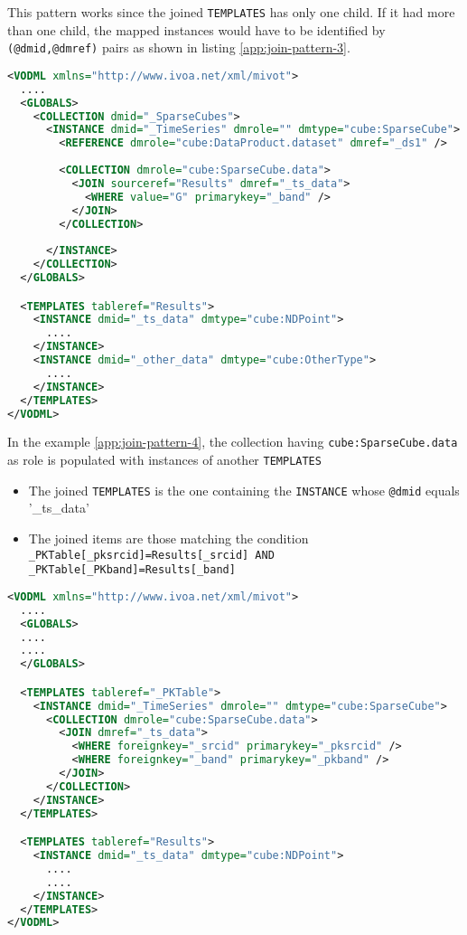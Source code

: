 This pattern works since the joined \texttt{TEMPLATES} has only one child. 
If it had more than one child, the mapped instances would have to be identified by \texttt{(@dmid,@dmref)} pairs as shown in listing \ref{app:join-pattern-3}.

\begin{lstlisting}[label={app:join-pattern-3},caption={Joining a \texttt{TEMPLATES} with a global \texttt{COLLECTION} identified by both \texttt{@sourceref} and \texttt{(@dmid,@dmref)} pairs.},language=XML]
<VODML xmlns="http://www.ivoa.net/xml/mivot">
  ....
  <GLOBALS>
    <COLLECTION dmid="_SparseCubes">
      <INSTANCE dmid="_TimeSeries" dmrole="" dmtype="cube:SparseCube">
        <REFERENCE dmrole="cube:DataProduct.dataset" dmref="_ds1" />
        
        <COLLECTION dmrole="cube:SparseCube.data">
          <JOIN sourceref="Results" dmref="_ts_data">
            <WHERE value="G" primarykey="_band" />
          </JOIN>
        </COLLECTION>
        
      </INSTANCE>
    </COLLECTION>
  </GLOBALS>

  <TEMPLATES tableref="Results">
    <INSTANCE dmid="_ts_data" dmtype="cube:NDPoint">
      ....
    </INSTANCE>
    <INSTANCE dmid="_other_data" dmtype="cube:OtherType">
      ....
    </INSTANCE>
  </TEMPLATES>
</VODML>
\end{lstlisting}  

In the example \ref{app:join-pattern-4}, the collection having \texttt{cube:SparseCube.data} as role is populated with  instances of another \texttt{TEMPLATES}
\begin{itemize}
  \item The joined \texttt{TEMPLATES} is the one containing the  \texttt{INSTANCE} whose \texttt{@dmid} equals '\_ts\_data'
  \item The joined items are those matching the condition \\ \texttt{\_PKTable[\_pksrcid]=Results[\_srcid] AND  \_PKTable[\_PKband]=Results[\_band]}
\end{itemize}


\begin{lstlisting}[label={app:join-pattern-4},caption={Joining two \texttt{TEMPLATES} together with \texttt{(@dmid,@dmref)} pairs.},language=XML]
<VODML xmlns="http://www.ivoa.net/xml/mivot">
  ....
  <GLOBALS>
  ....
  ....
  </GLOBALS>

  <TEMPLATES tableref="_PKTable">
    <INSTANCE dmid="_TimeSeries" dmrole="" dmtype="cube:SparseCube">
      <COLLECTION dmrole="cube:SparseCube.data">
        <JOIN dmref="_ts_data">
          <WHERE foreignkey="_srcid" primarykey="_pksrcid" />
          <WHERE foreignkey="_band" primarykey="_pkband" />
        </JOIN>
      </COLLECTION>
    </INSTANCE>
  </TEMPLATES>

  <TEMPLATES tableref="Results">
    <INSTANCE dmid="_ts_data" dmtype="cube:NDPoint">
      ....
      ....
    </INSTANCE>
  </TEMPLATES>
</VODML>
\end{lstlisting}  

